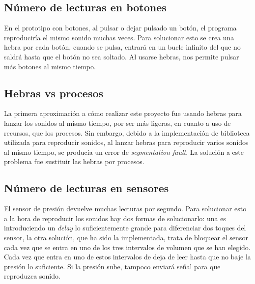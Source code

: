         \subsection{Número de lecturas en botones} %
        \label{sub:NumeroDeLecturasEnBotones}

            En el prototipo con botones, al pulsar o dejar pulsado un botón, el programa reproduciría el mismo
            sonido muchas veces. Para solucionar esto se crea una hebra por cada botón, cuando se pulsa, entrará
            en un bucle infinito del que no saldrá hasta que el botón no sea soltado. Al usarse hebras, nos
            permite pulsar más botones al mismo tiempo.


        \subsection{Hebras vs procesos} %
        \label{sub:HebrasVSProcesos}

            La primera aproximación a cómo realizar este proyecto fue usando hebras para lanzar los sonidos al mismo
            tiempo, por ser más ligeras, en cuanto a uso de recursos, que los procesos. Sin embargo, debido a la
            implementación de biblioteca utilizada para reproducir sonidos, al lanzar hebras para reproducir varios
            sonidos al mismo tiempo, se producía un error de \textit{segmentation fault}. La solución a este problema
            fue sustituir las hebras por procesos.


        \subsection{Número de lecturas en sensores} %
        \label{sub:NumeroDeLecturasEnSensores}

            El sensor de presión devuelve muchas lecturas por segundo. Para solucionar esto a la hora de reproducir los
            sonidos hay dos formas de solucionarlo: una es introduciendo un \textit{delay} lo suficientemente grande
            para diferenciar dos toques del sensor, la otra solución, que ha sido la implementada, trata de bloquear el
            sensor cada vez que se entra en uno de los tres intervalos de volumen que se han elegido. Cada vez que entra
            en uno de estos intervalos de deja de leer hasta que no baje la presión lo suficiente. Si la presión sube,
            tampoco enviará señal para que reproduzca sonido.


